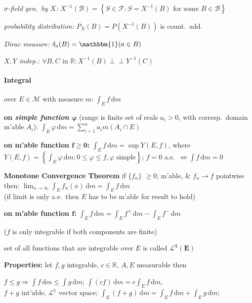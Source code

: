 \documentclass[8pt,twoside]{extarticle}
\newcommand{\indep}{\perp \!\!\! \perp}
\begin{document}
\begin{multicols}{2}
\textit{$\sigma$-field gen.\ by $X$:} $X^{-1}(\mathcal{B}){=} \left\{S{\in}\mathcal{F}: S{=}X^{-1}(B) \text{ for some } B {\in} \mathcal{B}\right\}$

\textit{probability distribution:} $P_X(B) = P(X^{-1}(B))$ is count.\ add.\

\textit{Dirac measure:} $\delta_a(B) = \mathbbm{1}(a\in B)$

\textit{$X,Y$ indep.:} $\forall B,C \text{ in } \mathbb{R}:  X^{-1}(B) \indep Y^{-1}(C)$



\paragraph{Integral} over $E \in \mathcal{M}$ with measure $m$: $\int_E f \,\mathrm{d}m$

\textbf{on \textit{simple function} $\boldsymbol{\varphi}$} (range is finite set of reals $a_i>0$, with corresp.\ domain m'able $A_i$): $\int_E \varphi \,\mathrm{d}m = \sum_{i=1}^n a_i m(A_i\cap E)$

\textbf{on m'able function $\boldsymbol{f\geq 0}$:} $\int_E f \, \mathrm{d}m = \sup Y(E,f)$, where 
$Y(E,f)=\left\{ \int_E \varphi\,\mathrm{d}m:0{\leq} \varphi{\leq} f, \varphi \text{ simple}\right\}$; $f{=}0$ a.e.\ $\Leftrightarrow \int\! f \,\mathrm{d} m{=}0$


\textbf{Monotone Convergence Theorem} if $\{f_n\}$ $\geq 0$, m'able,  \& $f_n \to f$ pointwise then: $\lim_{n\to\infty}\int_E f_n(x)\, \mathrm{d}m = \int_E f\,\mathrm{d}m$ \\ (if limit is only a.e.\ then $E$ has to be m'able for result to hold)

\textbf{on m'able function $\boldsymbol{f}$:} $\int_E f\, \mathrm{d}m = \int_E f^+\, \mathrm{d}m - \int_E f^-\, \mathrm{d}m $

($f$ is only integrable if both components are finite)

set of all functions that are integrable over $E$ is called $\boldsymbol{\mathcal{L}^1(E)}$

\textbf{Properties:} let $f,g$ integrable, $c\in\mathbb{R}$, $A,E$ measurable then

$f\leq g \Rightarrow \int f \, \mathrm{d}m \leq \int g \, \mathrm{d}m$; 
$\int (cf) \, \mathrm{d}m = c \int_E f \, \mathrm{d}m$,
$f{+}g \text{ int'able, } \mathcal{L}^1 \text{ vector space}$; 
$\int_E (f{+}g) \, \mathrm{d}m {=} \int_E f \, \mathrm{d}m {+} \int_E g \, \mathrm{d}m$;


\end{multicols}
\end{document}
